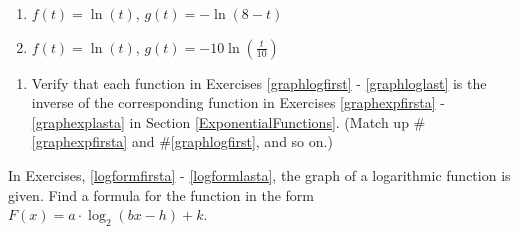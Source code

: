 \documentclass{ximera}
\begin{document}
\begin{multicols}{2}
\begin{enumerate}
\setcounter{enumi}{\value{HW}}


\item  $f(t) = \ln(t)$, $g(t) = -\ln(8-t)$

\item  $f(t) = \ln(t)$, $g(t) = -10\ln\left(\frac{t}{10}\right)$ \label{graphloglast}

\setcounter{HW}{\value{enumi}}
\end{enumerate}
\end{multicols}

\begin{enumerate}
\setcounter{enumi}{\value{HW}}

\smallskip

\item  Verify that each function in Exercises \ref{graphlogfirst} - \ref{graphloglast} is the inverse of the corresponding function in Exercises \ref{graphexpfirsta} - \ref{graphexplasta} in Section \ref{ExponentialFunctions}.  (Match up \#\ref{graphexpfirsta} and \#\ref{graphlogfirst}, and so on.)

\setcounter{HW}{\value{enumi}}
\end{enumerate}

In Exercises, \ref{logformfirsta} - \ref{logformlasta}, the graph of a logarithmic function is given.  Find a formula for the function in the form $F(x) = a \cdot \log_{2}(bx-h)+k$.
\end{document}
